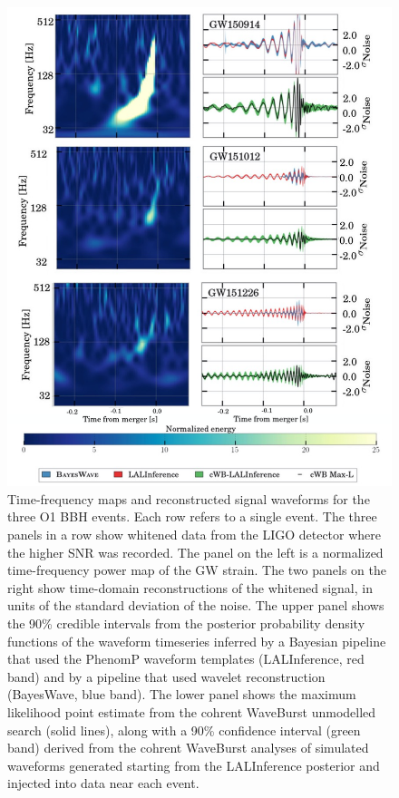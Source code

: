 \documentclass[binding=0.6cm, LaM]{sapthesis}
\begin{document}
        \begin{figure}[!t]
          \label{o1}
          \includegraphics[scale=0.4]{o1}
          \centering
          \caption{Time-frequency maps and reconstructed signal waveforms for the three O1 BBH events. Each row refers to a single event.  The three panels in a row show whitened data from the LIGO detector where the higher SNR was recorded. The panel on the left is a normalized time-frequency power map of the GW strain.  The two panels on the right show time-domain reconstructions of the whitened signal, in units of the standard deviation of the noise. The upper panel shows the 90\% credible intervals from the posterior probability density functions of the waveform timeseries inferred by a Bayesian pipeline that used the PhenomP waveform templates ({\ttfamily LALInference}, red band) and by a pipeline that used wavelet reconstruction ({\ttfamily BayesWave}, blue band).  The lower panel shows the maximum likelihood point estimate from the {\ttfamily cohrent WaveBurst} unmodelled search (solid lines), along with a 90\% confidence interval (green band) derived from the {\ttfamily cohrent WaveBurst} analyses of simulated waveforms generated starting from the {\ttfamily LALInference} posterior and injected into data near each event. \cite{193}}
          \label{fig:o1}
        \end{figure}
\end{document}
